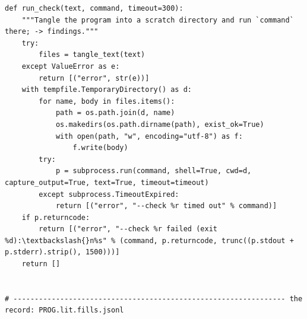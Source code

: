 \documentclass[10pt,a4paper]{article}
\begin{document}
\begin{Verbatim}
def run_check(text, command, timeout=300):
    """Tangle the program into a scratch directory and run `command` there; -> findings."""
    try:
        files = tangle_text(text)
    except ValueError as e:
        return [("error", str(e))]
    with tempfile.TemporaryDirectory() as d:
        for name, body in files.items():
            path = os.path.join(d, name)
            os.makedirs(os.path.dirname(path), exist_ok=True)
            with open(path, "w", encoding="utf-8") as f:
                f.write(body)
        try:
            p = subprocess.run(command, shell=True, cwd=d, capture_output=True, text=True, timeout=timeout)
        except subprocess.TimeoutExpired:
            return [("error", "--check %r timed out" % command)]
    if p.returncode:
        return [("error", "--check %r failed (exit %d):\textbackslash{}n%s" % (command, p.returncode, trunc((p.stdout + p.stderr).strip(), 1500)))]
    return []


# ---------------------------------------------------------------- the record: PROG.lit.fills.jsonl
\end{Verbatim}
\end{document}
